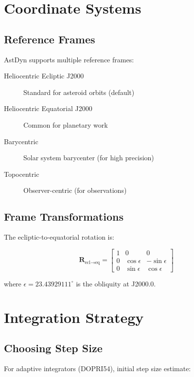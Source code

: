 \section{Coordinate Systems}

\subsection{Reference Frames}

AstDyn supports multiple reference frames:

\begin{description}
    \item[Heliocentric Ecliptic J2000] Standard for asteroid orbits (default)
    \item[Heliocentric Equatorial J2000] Common for planetary work
    \item[Barycentric] Solar system barycenter (for high precision)
    \item[Topocentric] Observer-centric (for observations)
\end{description}

\subsection{Frame Transformations}

The ecliptic-to-equatorial rotation is:

\begin{equation}
    \mathbf{R}_{\text{ecl} \to \text{eq}} = \begin{bmatrix}
        1 & 0 & 0 \\
        0 & \cos\epsilon & -\sin\epsilon \\
        0 & \sin\epsilon & \cos\epsilon
    \end{bmatrix}
\end{equation}

where $\epsilon = 23.43929111^\circ$ is the obliquity at J2000.0.

\section{Integration Strategy}

\subsection{Choosing Step Size}

For adaptive integrators (DOPRI54), initial step size estimate:

